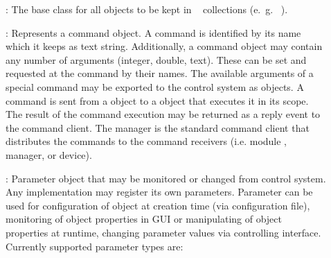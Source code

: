 \begin{description}

\item[] :  The base class for all objects to be kept in \dabc~ collections (e.~g.~ ).

\item[] : 
Represents a command object. A command 
   is identified by its name which it keeps as text string. Additionally, 
   a command object may contain any number of arguments (integer, double, text). 
   These can be set and requested at the command by their names. 
   The available arguments of a special command may be exported to the control 
   system as  objects. A command is sent from a 
    object to a  object
    that executes it in its scope. 
   The result of the command execution may be returned as a reply event to 
   the command client. The manager is the standard command client 
   that distributes the commands to the command receivers 
   (i.e. module , manager, or device). 

\item[] :   
Parameter object that may be monitored or 
   changed from control system. Any  implementation 
   may register its own parameters. Parameter can be used for configuration of object 
   at creation time (via configuration file), monitoring of object properties in GUI or
   manipulating of object properties at runtime, changing parameter values via controlling 
   interface.  Currently supported parameter types are:


\end{description}
